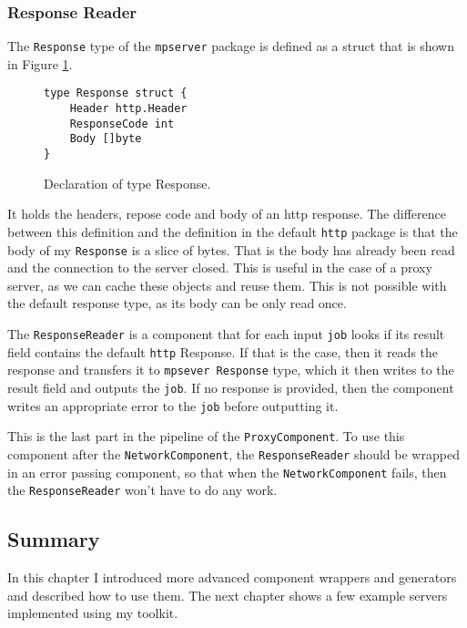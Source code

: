 \newpage
\subsubsection{Response Reader}
The \texttt{Response} type of the \texttt{mpserver} package is defined as
a struct that is shown in Figure \ref{fig:Response}.
\begin{figure}[h]
\centering
\begin{lstlisting}
type Response struct {
    Header http.Header
    ResponseCode int
    Body []byte
}
\end{lstlisting}
\caption[scale=1.0]{Declaration of type Response.}
\label{fig:Response}
\end{figure}

It holds the headers, repose code and body of an http response. 
The difference between
this definition and the definition in the default \texttt{http} package is that
the body of my \texttt{Response} is a slice of bytes. 
That is the body has already been
read and the connection to the server closed. This is useful
in the case of a proxy server, as we can cache these objects and reuse
them. This is not possible with the default response type,
as its body can be only read once.

The \texttt{ResponseReader} is a component that for each input \texttt{job}
looks if its result field contains the default \texttt{http} Response. 
If that is the case,
then it reads the response and transfers it to \texttt{mpsever Response} 
type, which it
then writes to the result field and outputs the \texttt{job}. If no response
is provided, then the component writes an appropriate error to the
\texttt{job} before outputting it.

This is the last part in the pipeline of the \texttt{ProxyComponent}.
To use this component after the \texttt{NetworkComponent}, 
the \texttt{ResponseReader} should be wrapped in an error passing 
component, so that when the \texttt{Network\-Component} fails, then 
the \texttt{ResponseReader} won't have to do any work.


\subsection{Summary}
In this chapter I introduced more advanced component wrappers and generators
and described how to use them. The next chapter shows a few example
servers implemented using my toolkit.

